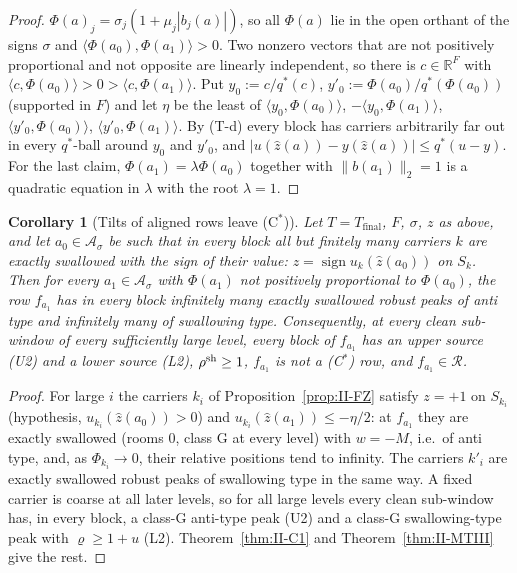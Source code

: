 \documentclass[10pt]{amsart}
\newtheorem{corollary}[theorem]{Corollary}
\theoremstyle{definition}
\theoremstyle{remark}
\newcommand{\sgn}{\operatorname{sign}}
\newcommand{\R}{\mathbb R}
\newcommand{\Rec}{\mathcal R}
\newcommand{\zh}{\hat z}
\newcommand{\ip}[2]{\langle #1,#2\rangle}
\begin{document}
\begin{proof}
$\Phi(a)_j=\sigma_j(1+\mu_j|b_j(a)|)$, so all $\Phi(a)$ lie in the open orthant of
the signs $\sigma$ and $\ip{\Phi(a_0)}{\Phi(a_1)}>0$.  Two nonzero vectors that
are not positively proportional and not opposite are linearly independent,
so there is $c\in\R^F$ with $\ip c{\Phi(a_0)}>0>\ip c{\Phi(a_1)}$.  Put $y_0:=
c/q^*(c)$, $y'_0:=\Phi(a_0)/q^*(\Phi(a_0))$ (supported in $F$) and let $\eta$ be the
least of $\ip{y_0}{\Phi(a_0)}$, $-\ip{y_0}{\Phi(a_1)}$, $\ip{y'_0}{\Phi(a_0)}$,
$\ip{y'_0}{\Phi(a_1)}$.  By (T-d) every block has carriers arbitrarily far out
in every $q^*$-ball around $y_0$ and $y'_0$, and $|u(\zh(a))-y(\zh(a))|\le
q^*(u-y)$.  For the last claim, $\Phi(a_1)=\lambda\Phi(a_0)$ together with
$\|b(a_1)\|_2=1$ is a quadratic equation in $\lambda$ with the root $\lambda=1$.
\end{proof}

\begin{corollary}[Tilts of aligned rows leave (C$^*$)]\label{cor:II-FZ}
Let $T=T_{\mathrm{final}}$, $F$, $\sigma$, $z$ as above, and let $a_0\in\mathcal
A_\sigma$ be such that in every block all but finitely many carriers $k$ are
exactly swallowed with the sign of their value: $z=\sgn u_k(\zh(a_0))$ on
$S_k$.  Then for every $a_1\in\mathcal A_\sigma$ with $\Phi(a_1)$ not positively
proportional to $\Phi(a_0)$, the row $f_{a_1}$ has in every block infinitely
many exactly swallowed robust peaks of anti type and infinitely many of
swallowing type.  Consequently, at every clean sub-window of every
sufficiently large level, every block of $f_{a_1}$ has an upper source
\textup{(U2)} and a lower source \textup{(L2)}, $\rho^{\rm sh}\ge1$, $f_{a_1}$ is
not a \textup{(C$^*$)} row, and $f_{a_1}\in\Rec$.
\end{corollary}

\begin{proof}
For large $i$ the carriers $k_i$ of Proposition~\ref{prop:II-FZ} satisfy
$z=+1$ on $S_{k_i}$ (hypothesis, $u_{k_i}(\zh(a_0))>0$) and $u_{k_i}(\zh(a_1))\le
-\eta/2$: at $f_{a_1}$ they are exactly swallowed (rooms $0$, class G at
every level) with $w=-M$, i.e.\ of anti type, and, as $\Phi_{k_i}\to0$, their
relative positions tend to infinity.  The carriers $k'_i$ are exactly
swallowed robust peaks of swallowing type in the same way.  A fixed carrier
is coarse at all later levels, so for all large levels every clean
sub-window has, in every block, a class-G anti-type peak (U2) and a class-G
swallowing-type peak with $\varrho\ge1+u$ (L2).  Theorem~\ref{thm:II-C1} and
Theorem~\ref{thm:II-MTIII} give the rest.
\end{proof}
\end{document}

